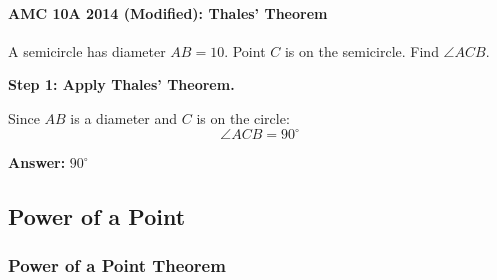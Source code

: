 ﻿\documentclass[12pt]{extarticle}
\begin{document}
\paragraph{AMC 10A 2014 (Modified): Thales' Theorem}

A semicircle has diameter $AB = 10$. Point $C$ is on the semicircle. Find $\angle ACB$.

\begin{solutionbox}
\textbf{Step 1: Apply Thales' Theorem.}

Since $AB$ is a diameter and $C$ is on the circle:
\[\angle ACB = 90^{\circ}\]

\textbf{Answer:} $\boxed{90^{\circ}}$
\end{solutionbox}

\subsection{Power of a Point}

\subsubsection{Power of a Point Theorem}
\end{document}
